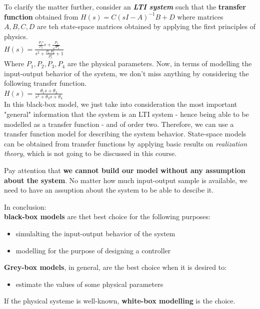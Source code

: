 To clarify the matter further, consider an \textbf{\textit{LTI system}} such that the \textbf{transfer function} obtained from \(H(s) = C (sI - A)^{-1}B +D\) where matrices \(A, B, C, D\) are teh state-space matrices obtained by applying the first principles of physics.\\

\(
H(s) = \frac{ \frac{P_1²}{P_2} s + \frac{P_3}{\sqrt{P_4}}}{s^2 + \frac{P_1.P_2}{P_3^3} + 1}
\)\\

Where \(P_1, P_2, P_3, P_4\) are the physical parameters. Now, in terms of modelling the input-output behavior of the system, we don't miss anything by considering the following transfer function.\\

\(
H(s) = \frac{\theta_1 s + \theta_2}{s^2 + \theta_3 s + \theta_4}
\)\\

In this black-box model, we just take into consideration the most important "general" information that the system is an LTI system - hence being able to be modelled as a transfer function - and of order two. Therefore, we can use a transfer function model for describing the system behavior. State-space models can be obtained from transfer functions by applying basic results on \textit{realization theory}, which is not going to be discussed in this course.\\

\begin{factbox}
    Pay attention that \textbf{we cannot build our model without any assumption about the system}. No matter how much input-output sample is available,  we need to have an assuption about the system to be able to descibe it.
\end{factbox}

In conclusion: \\
\textbf{black-box models} are thet best choice for the following purposes:
\begin{itemize}
    \item simulalting the input-output behavior of the system
    \item modelling for the purpose of designing a controller\\
\end{itemize}

\textbf{Grey-box models}, in general, are the best choice when it is desired to:
\begin{itemize}
    \item estimate the values of some physical parameters \\
\end{itemize}

If the physical systeme is well-known, \textbf{white-box modelling} is the choice.

